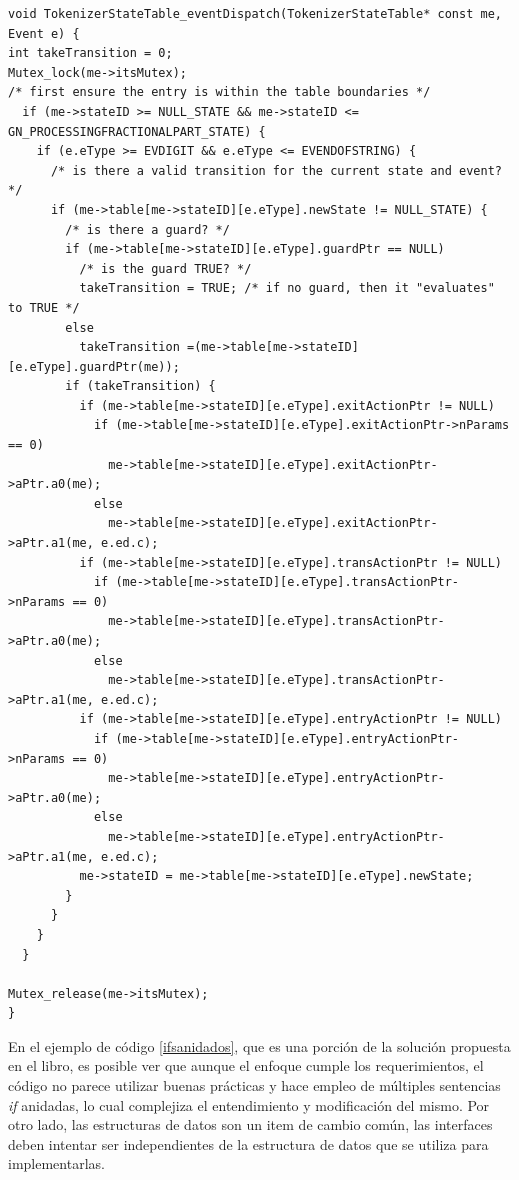 \begin{lstlisting}[caption=Código ejemplo Douglass State Table, label={ifsanidados}]
void TokenizerStateTable_eventDispatch(TokenizerStateTable* const me, Event e) {
int takeTransition = 0;
Mutex_lock(me->itsMutex);
/* first ensure the entry is within the table boundaries */
  if (me->stateID >= NULL_STATE && me->stateID <= GN_PROCESSINGFRACTIONALPART_STATE) {
    if (e.eType >= EVDIGIT && e.eType <= EVENDOFSTRING) {
      /* is there a valid transition for the current state and event? */
      if (me->table[me->stateID][e.eType].newState != NULL_STATE) {
        /* is there a guard? */
        if (me->table[me->stateID][e.eType].guardPtr == NULL)
          /* is the guard TRUE? */
          takeTransition = TRUE; /* if no guard, then it "evaluates" to TRUE */
        else
          takeTransition =(me->table[me->stateID][e.eType].guardPtr(me));
        if (takeTransition) {
          if (me->table[me->stateID][e.eType].exitActionPtr != NULL)
            if (me->table[me->stateID][e.eType].exitActionPtr->nParams == 0)
              me->table[me->stateID][e.eType].exitActionPtr->aPtr.a0(me);
            else
              me->table[me->stateID][e.eType].exitActionPtr->aPtr.a1(me, e.ed.c);
          if (me->table[me->stateID][e.eType].transActionPtr != NULL)
            if (me->table[me->stateID][e.eType].transActionPtr->nParams == 0)
              me->table[me->stateID][e.eType].transActionPtr->aPtr.a0(me);
            else
              me->table[me->stateID][e.eType].transActionPtr->aPtr.a1(me, e.ed.c);
          if (me->table[me->stateID][e.eType].entryActionPtr != NULL)
            if (me->table[me->stateID][e.eType].entryActionPtr->nParams == 0)
              me->table[me->stateID][e.eType].entryActionPtr->aPtr.a0(me);
            else
              me->table[me->stateID][e.eType].entryActionPtr->aPtr.a1(me, e.ed.c);
          me->stateID = me->table[me->stateID][e.eType].newState;
        }
      }
    }
  }

Mutex_release(me->itsMutex);
}
\end{lstlisting}

En el ejemplo de código \ref{ifsanidados}, que es una porción de la solución propuesta en el libro, es posible ver que aunque el enfoque cumple los requerimientos, el código no parece utilizar buenas prácticas y hace empleo de múltiples sentencias \textit{if} anidadas, lo cual complejiza el entendimiento y modificación del mismo. Por otro lado, las estructuras de datos son un item de cambio común, las interfaces deben intentar ser independientes de la estructura de datos que se utiliza para implementarlas.

